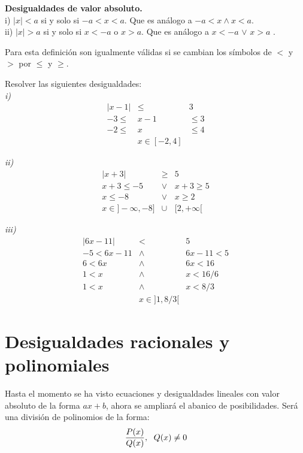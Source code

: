 \begin{mydef}
\textbf{Desigualdades de valor absoluto.}\\

\noindent i) $|x|<a$ si y solo si $-a<x<a$. Que es análogo a $ -a<x\wedge x<a$.\\
\noindent ii) $|x|>a$ si y solo si $x<-a$ o $x>a$. Que es análogo a $x<-a$ $\vee$ $x>a$ .
\end{mydef}
Para esta definición son igualmente válidas si se cambian los símbolos de $<$ y $>$ por $\leq$ y $\geq$. 

\begin{myexample}
\label{ejemplodosd}
Resolver las siguientes desigualdades:\\

\noindent\textit{i)}\\
\begin{eqnarray*}
|x-1|&\leq &  3\\
-3 \leq & x-1 &\leq 3 \\
-2 \leq & x &\leq  4 \\
&x\in [-2,4]&
\end{eqnarray*}

\noindent\textit{ii)}\\
\begin{eqnarray*}
|x+3|&\geq & 5 \\
x+3\leq -5 &\vee &x+3\geq 5\\
x\leq -8 &\vee &x\geq 2\\
x\in ]-\infty,-8]&\cup & [2,+\infty [
\end{eqnarray*}
\end{myexample}

\noindent\textit{iii)}\\
\begin{eqnarray*}
|6x-11| &<& 5 \\
-5< 6x-11 &\wedge& 6x-11<5\\
6< 6x &\wedge & 6x<16\\
1< x &\wedge & x<16/6\\
1< x &\wedge & x<8/3\\
&x\in ]1,8/3[ &
\end{eqnarray*}

\section{Desigualdades racionales y polinomiales}
Hasta el momento se ha visto ecuaciones y desigualdades lineales con valor absoluto de la forma $ax+b$, ahora se ampliará el abanico de posibilidades. Será una división de polinomios de la forma:
\begin{eqnarray*}
\dfrac{P(x)}{Q(x)}, \hspace{6px} Q(x)\neq 0
\end{eqnarray*}

